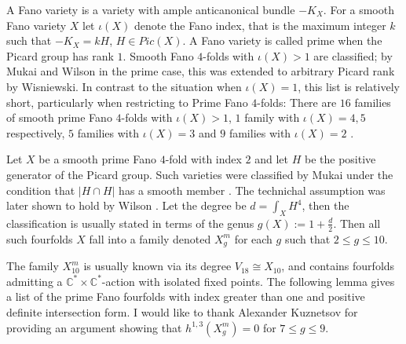 \documentclass[12pt]{article}
\begin{document}
A Fano variety is a variety with ample anticanonical bundle $-K_{X}$. For a smooth Fano variety $X$ let $\iota(X)$ denote the Fano index, that is the maximum integer $k$ such that $-K_{X} = kH$,  $H \in Pic(X)$. A Fano variety is called prime when the Picard group has rank $1$. Smooth Fano $4$-folds with $\iota(X)>1$ are classified; by Mukai and Wilson in the prime case, this was extended to arbitrary Picard rank by Wisniewski. In contrast to the situation when $\iota(X)=1$, this list is relatively short, particularly when restricting to Prime Fano $4$-folds: There are $16$ families of smooth prime Fano $4$-folds with $\iota(X)>1$, $1$ family with $\iota(X)= 4,5$ respectively, $5$ families with $\iota(X)= 3$ and $9$ families with  $\iota(X)= 2$ \cite[Tables 1-4]{CGKS}. 


Let $X$ be a smooth prime Fano $4$-fold with index $2$ and let $H$ be the positive generator of the Picard group. Such varieties were classified by Mukai under the condition that $|H\cap H|$ has a smooth member \cite{Mu}. The technichal assumption was later shown to hold by Wilson \cite{W}. Let the degree be $d = \int_{X}H^4$, then the classification is usually stated in terms of the genus $g(X) := 1+ \frac{d}{2}$. Then all such fourfolds $X$ fall into a family denoted $X^{m}_{g}$ for each $g$ such that $2 \leq g \leq 10$.

The family $X_{10}^m$ is usually known via its degree $V_{18} \cong X_{10}$, and contains fourfolds admitting a $\mathbb{C}^*\times \mathbb{C}^*$-action with isolated fixed points. The following lemma gives a list of the prime Fano fourfolds with index greater than one and positive definite intersection form.  I would like to thank Alexander Kuznetsov for providing an argument showing that $h^{1,3}(X^{m}_g) = 0$  for $7 \leq g \leq 9$.
\end{document}
